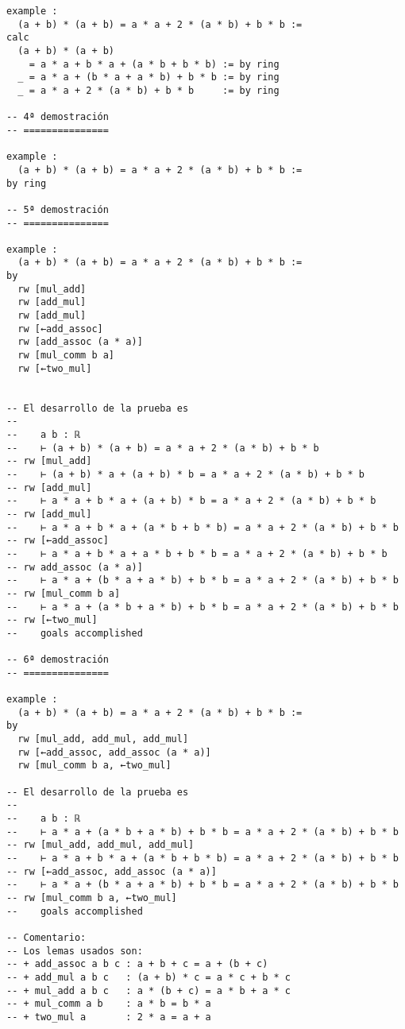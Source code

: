 \begin{verbatim}
example :
  (a + b) * (a + b) = a * a + 2 * (a * b) + b * b :=
calc
  (a + b) * (a + b)
    = a * a + b * a + (a * b + b * b) := by ring
  _ = a * a + (b * a + a * b) + b * b := by ring
  _ = a * a + 2 * (a * b) + b * b     := by ring

-- 4ª demostración
-- ===============

example :
  (a + b) * (a + b) = a * a + 2 * (a * b) + b * b :=
by ring

-- 5ª demostración
-- ===============

example :
  (a + b) * (a + b) = a * a + 2 * (a * b) + b * b :=
by
  rw [mul_add]
  rw [add_mul]
  rw [add_mul]
  rw [←add_assoc]
  rw [add_assoc (a * a)]
  rw [mul_comm b a]
  rw [←two_mul]


-- El desarrollo de la prueba es
--
--    a b : ℝ
--    ⊢ (a + b) * (a + b) = a * a + 2 * (a * b) + b * b
-- rw [mul_add]
--    ⊢ (a + b) * a + (a + b) * b = a * a + 2 * (a * b) + b * b
-- rw [add_mul]
--    ⊢ a * a + b * a + (a + b) * b = a * a + 2 * (a * b) + b * b
-- rw [add_mul]
--    ⊢ a * a + b * a + (a * b + b * b) = a * a + 2 * (a * b) + b * b
-- rw [←add_assoc]
--    ⊢ a * a + b * a + a * b + b * b = a * a + 2 * (a * b) + b * b
-- rw add_assoc (a * a)]
--    ⊢ a * a + (b * a + a * b) + b * b = a * a + 2 * (a * b) + b * b
-- rw [mul_comm b a]
--    ⊢ a * a + (a * b + a * b) + b * b = a * a + 2 * (a * b) + b * b
-- rw [←two_mul]
--    goals accomplished

-- 6ª demostración
-- ===============

example :
  (a + b) * (a + b) = a * a + 2 * (a * b) + b * b :=
by
  rw [mul_add, add_mul, add_mul]
  rw [←add_assoc, add_assoc (a * a)]
  rw [mul_comm b a, ←two_mul]

-- El desarrollo de la prueba es
--
--    a b : ℝ
--    ⊢ a * a + (a * b + a * b) + b * b = a * a + 2 * (a * b) + b * b
-- rw [mul_add, add_mul, add_mul]
--    ⊢ a * a + b * a + (a * b + b * b) = a * a + 2 * (a * b) + b * b
-- rw [←add_assoc, add_assoc (a * a)]
--    ⊢ a * a + (b * a + a * b) + b * b = a * a + 2 * (a * b) + b * b
-- rw [mul_comm b a, ←two_mul]
--    goals accomplished

-- Comentario:
-- Los lemas usados son:
-- + add_assoc a b c : a + b + c = a + (b + c)
-- + add_mul a b c   : (a + b) * c = a * c + b * c
-- + mul_add a b c   : a * (b + c) = a * b + a * c
-- + mul_comm a b    : a * b = b * a
-- + two_mul a       : 2 * a = a + a
\end{verbatim}


